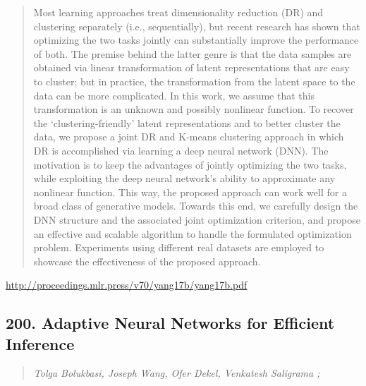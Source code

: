\documentclass{article}
\begin{document}
\begin{quote}
    Most learning approaches treat dimensionality reduction (DR) and clustering separately (i.e., sequentially), but recent research has shown that optimizing the two tasks jointly can substantially improve the performance of both. The premise behind the latter genre is that the data samples are obtained via linear transformation of latent representations that are easy to cluster; but in practice, the transformation from the latent space to the data can be more complicated. In this work, we assume that this transformation is an unknown and possibly nonlinear function. To recover the `clustering-friendly’ latent representations and to better cluster the data, we propose a joint DR and K-means clustering approach in which DR is accomplished via learning a deep neural network (DNN). The motivation is to keep the advantages of jointly optimizing the two tasks, while exploiting the deep neural network’s ability to approximate any nonlinear function. This way, the proposed approach can work well for a broad class of generative models. Towards this end, we carefully design the DNN structure and the associated joint optimization criterion, and propose an effective and scalable algorithm to handle the formulated optimization problem. Experiments using different real datasets are employed to showcase the effectiveness of the proposed approach.  \end{quote}

\href{http://proceedings.mlr.press/v70/yang17b/yang17b.pdf}{http://proceedings.mlr.press/v70/yang17b/yang17b.pdf}

\subsection{200. Adaptive Neural Networks for Efficient Inference}

\begin{quote}
\footnotesize{\textit{Tolga Bolukbasi, Joseph Wang, Ofer Dekel, Venkatesh Saligrama ;}}
\end{quote}
\end{document}
